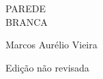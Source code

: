 
\PBtitle
{
PAREDE\\BRANCA
}

\PBsubtitle
{
}

\PBauthor
{
Marcos Aurélio Vieira
}

\PBedition
{
Edição não revisada
}

\PBmaketitle